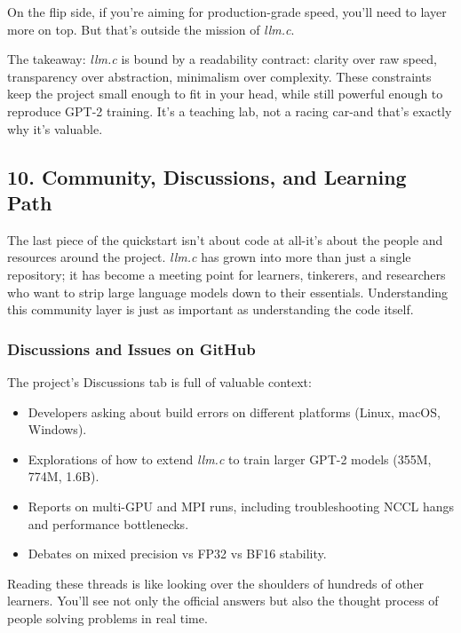 \documentclass[
  letterpaper,
  DIV=11,
  numbers=noendperiod]{scrreprt}
\providecommand{\tightlist}{%
  \setlength{\itemsep}{0pt}\setlength{\parskip}{0pt}}
\begin{document}
On the flip side, if you're aiming for production-grade speed, you'll
need to layer more on top. But that's outside the mission of
\emph{llm.c}.

The takeaway: \emph{llm.c} is bound by a readability contract: clarity
over raw speed, transparency over abstraction, minimalism over
complexity. These constraints keep the project small enough to fit in
your head, while still powerful enough to reproduce GPT-2 training. It's
a teaching lab, not a racing car-and that's exactly why it's valuable.

\subsection{10. Community, Discussions, and Learning
Path}\label{community-discussions-and-learning-path}

The last piece of the quickstart isn't about code at all-it's about the
people and resources around the project. \emph{llm.c} has grown into
more than just a single repository; it has become a meeting point for
learners, tinkerers, and researchers who want to strip large language
models down to their essentials. Understanding this community layer is
just as important as understanding the code itself.

\subsubsection{Discussions and Issues on
GitHub}\label{discussions-and-issues-on-github}

The project's Discussions tab is full of valuable context:

\begin{itemize}
\tightlist
\item
  Developers asking about build errors on different platforms (Linux,
  macOS, Windows).
\item
  Explorations of how to extend \emph{llm.c} to train larger GPT-2
  models (355M, 774M, 1.6B).
\item
  Reports on multi-GPU and MPI runs, including troubleshooting NCCL
  hangs and performance bottlenecks.
\item
  Debates on mixed precision vs FP32 vs BF16 stability.
\end{itemize}

Reading these threads is like looking over the shoulders of hundreds of
other learners. You'll see not only the official answers but also the
thought process of people solving problems in real time.
\end{document}
